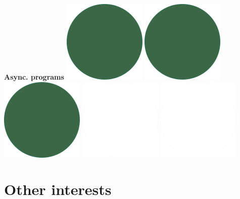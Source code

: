 \documentclass[]{commands}
\begin{document}
\begin{aside}
\textbf{Async. programs}\hfill
\includegraphics[scale=0.11]{img/IPSGreenDots.png}
\includegraphics[scale=0.11]{img/IPSGreenDots.png}
\includegraphics[scale=0.11]{img/IPSGreenDots.png}
\includegraphics[scale=0.11]{img/WhiteDots.png}
\includegraphics[scale=0.11]{img/WhiteDots.png}

\vspace{3.5mm}
\section{Other interests}
\vspace{3.5mm}


\end{aside}
\end{document}
